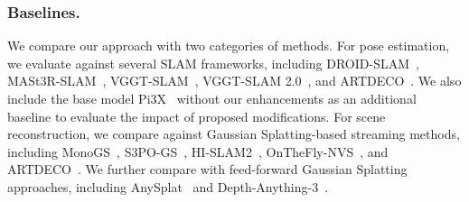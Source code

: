 \subsubsection{Baselines.}
We compare our approach with two categories of methods. For pose estimation, we evaluate against several SLAM frameworks, including DROID-SLAM~\cite{teed2021droid}, MASt3R-SLAM~\cite{murai2024_mast3rslam}, VGGT-SLAM~\cite{maggio2025vggt}, VGGT-SLAM 2.0~\cite{maggio2026vggt}, and ARTDECO~\cite{artdeco}. 
We also include the base model Pi3X~\cite{wang2025pi} without our enhancements as an additional baseline to evaluate the impact of proposed modifications.
For scene reconstruction, we compare against Gaussian Splatting-based streaming methods, including MonoGS~\cite{matsuki2024gaussian}, S3PO-GS~\cite{cheng2025outdoor}, HI-SLAM2~\cite{zhang2025hi}, OnTheFly-NVS~\cite{meuleman2025fly}, and ARTDECO~\cite{artdeco}. 
We further compare with feed-forward Gaussian Splatting approaches, including AnySplat~\cite{jiang2025anysplat} and Depth-Anything-3~\cite{lin2025depth}.


